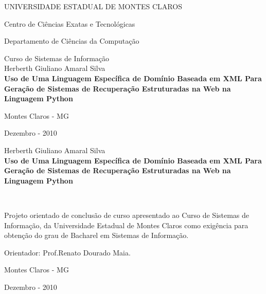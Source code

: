 \documentclass[a4paper,12pt]{report}
\begin{document}
\begin{titlepage}
\begin{center}
UNIVERSIDADE ESTADUAL DE MONTES CLAROS

Centro de Ciências Exatas e Tecnológicas

Departamento de Ciências da Computação

Curso de Sistemas de Informação
\\[2cm]
Herberth Giuliano Amaral Silva
\\[7cm]
\textbf {Uso de Uma Linguagem Específica de Domínio Baseada em XML Para Geração de Sistemas de Recuperação Estruturadas na Web na Linguagem Python}

\vfill
Montes Claros - MG

Dezembro - 2010



\end{center}
\end{titlepage}

\thispagestyle{empty}
\addtocounter{page}{-1}

\begin{center}
	Herberth Giuliano Amaral Silva
	\\[4cm]
	\textbf{Uso de Uma Linguagem Específica de Domínio Baseada em XML Para Geração de Sistemas de Recuperação Estruturadas na Web na Linguagem Python}
\end{center}
	\ \\[3cm]
	
\begin{flushright}
	\begin{small}
		\parbox{200pt}{Projeto orientado de conclusão de curso apresentado ao Curso de Sistemas de Informação,	da Universidade Estadual de Montes Claros como exigência para obtenção do grau de Bacharel	em Sistemas de Informação.}

		\parbox{200pt}{Orientador: Prof.Renato Dourado Maia.}
		
	\end{small}
\end{flushright}

\begin{center}	
	\vfill
	Montes Claros - MG
	
	Dezembro - 2010 
\end{center}


\renewcommand{\contentsname}{Índice}
\renewcommand{\chaptername}{Capítulo}
\renewcommand{\bibname}{Bibliografia}
\renewcommand{\lstlistingname}{Listagem}
\renewcommand{\appendixname}{Apêndice}
\renewcommand{\listfigurename}{Lista de Figuras}
\renewcommand{\listlistingname}{Lista de Listagens}
%


\def\us{\char`\_}

\tableofcontents
\listoffigures
\listoflistings

\doublespacing








\clearpage
{}


\end{document}
